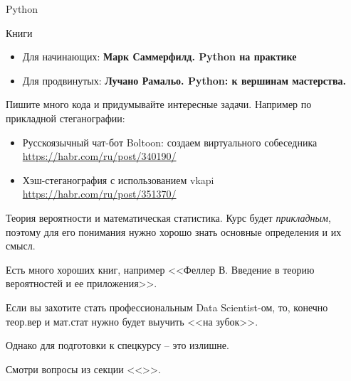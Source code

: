 \documentclass{beamer}
\begin{document}
  \begin{frame}{Python}
  
  Книги
  \begin{itemize}
  	\item Для начинающих: 
  	\textbf{Марк Саммерфилд. Python на практике} 
  	\item 
  	Для продвинутых:
  	\textbf{Лучано Рамальо. Python: к вершинам мастерства.}
  \end{itemize}
  
  Пишите много кода и придумывайте интересные задачи. 
  Например по прикладной стеганографии:
  \begin{itemize}
  	\item Русскоязычный чат-бот Boltoon: создаем виртуального собеседника
  	\url{https://habr.com/ru/post/340190/}
  	\item Хэш-стеганография с использованием vkapi
  	\url{https://habr.com/ru/post/351370/}
  \end{itemize}
\end{frame}


\begin{frame}{Теория вероятности и математическая статистика.}
Курс будет \textit{прикладным}, поэтому для его понимания 
нужно хорошо знать основные определения и их смысл.

Есть много хороших книг, например 
<<Феллер В. Введение в теорию вероятностей и ее приложения>>.

Если вы захотите стать профессиональным Data Scientist-ом,
то, конечно теор.вер и мат.стат нужно будет выучить <<на зубок>>.

Однако для подготовки к спецкурсу -- это излишне.

Смотри вопросы из секции <<>>.
\end{frame}
  
\end{document}
